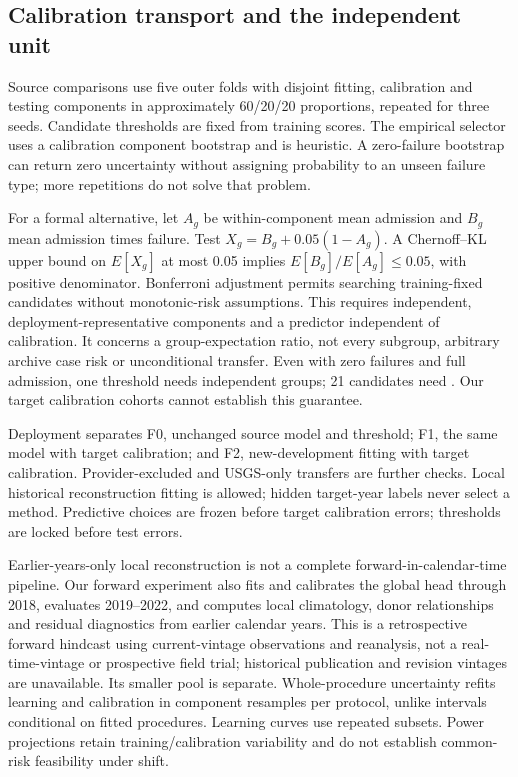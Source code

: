 

\subsection{Calibration transport and the independent unit}

Source comparisons use five outer folds with disjoint fitting, calibration and testing components in approximately 60/20/20 proportions, repeated for three seeds. Candidate thresholds are fixed from training scores. The empirical selector uses a calibration component bootstrap and is heuristic. A zero-failure bootstrap can return zero uncertainty without assigning probability to an unseen failure type; more repetitions do not solve that problem.

For a formal alternative, let $A_g$ be within-component mean admission and $B_g$ mean admission times failure. Test $X_g=B_g+0.05(1-A_g)$. A Chernoff--KL upper bound on $E[X_g]$ at most 0.05 implies $E[B_g]/E[A_g]\leq0.05$, with positive denominator. Bonferroni adjustment permits searching training-fixed candidates without monotonic-risk assumptions. This requires independent, deployment-representative components and a predictor independent of calibration. It concerns a group-expectation ratio, not every subgroup, arbitrary archive case risk or unconditional transfer. Even with zero failures and full admission, one threshold needs \RSingleThresholdGroups{} independent groups; 21 candidates need \RGridThresholdGroups{}. Our target calibration cohorts cannot establish this guarantee.

Deployment separates F0, unchanged source model and threshold; F1, the same model with target calibration; and F2, new-development fitting with target calibration. Provider-excluded and USGS-only transfers are further checks. Local historical reconstruction fitting is allowed; hidden target-year labels never select a method. Predictive choices are frozen before target calibration errors; thresholds are locked before test errors.

Earlier-years-only local reconstruction is not a complete forward-in-calendar-time pipeline. Our forward experiment also fits and calibrates the global head through 2018, evaluates 2019--2022, and computes local climatology, donor relationships and residual diagnostics from earlier calendar years. This is a retrospective forward hindcast using current-vintage observations and reanalysis, not a real-time-vintage or prospective field trial; historical publication and revision vintages are unavailable. Its smaller pool is separate. Whole-procedure uncertainty refits learning and calibration in \RWholeRetRefits{} component resamples per protocol, unlike intervals conditional on fitted procedures. Learning curves use repeated subsets. Power projections retain training/calibration variability and do not establish common-risk feasibility under shift.

